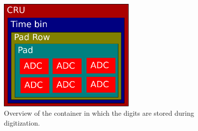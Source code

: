 \documentclass[12pt,DIV=14,parskip=half]{scrartcl}
\begin{document}
\begin{figure}
\centering
\includegraphics[width=0.6\textwidth]{figures/container}
\caption{Overview of the container in which the digits are stored during digitization.}
\label{fig:container}
\end{figure}
\end{document}
